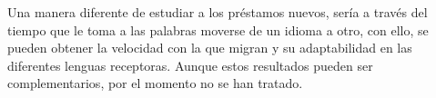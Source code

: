 Una manera diferente de estudiar a los préstamos nuevos, sería a través del tiempo que le toma a las palabras moverse de un idioma a otro, con ello, se pueden obtener la velocidad con la que migran y su adaptabilidad en las diferentes lenguas receptoras. Aunque estos resultados pueden ser complementarios, por el momento no se han tratado. 



















